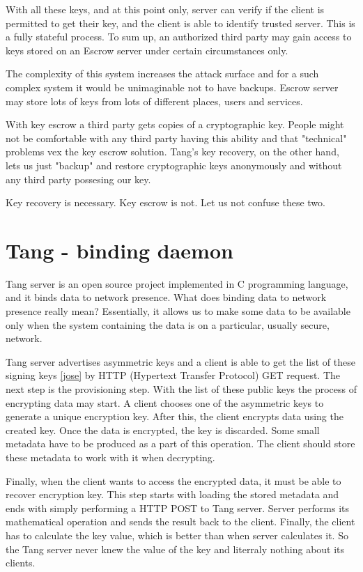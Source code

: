 With all these keys, and at this point only, server can verify if the client is permitted to get their key, and the client is able to identify trusted server.
This is a fully stateful process.
To sum up, an authorized third party may gain access to keys stored on an Escrow server under certain circumstances only.

The complexity of this system increases the attack surface and for a such complex system it would be unimaginable not to have backups.
Escrow server may store lots of keys from lots of different places, users and services.

With key escrow a third party gets copies of a cryptographic key.
People might not be comfortable with any third party having this ability and that "technical" problems vex the key escrow solution.
Tang's key recovery, on the other hand, lets us just "backup" and restore cryptographic keys anonymously and without any third party possesing our key.

Key recovery is necessary.
Key escrow is not.
Let us not confuse these two.

\section{Tang - binding daemon}

Tang server is an open source project implemented in C programming language, and it binds data to network presence.
What does binding data to network presence really mean? 
Essentially, it allows us to make some data to be available only when the system containing the data is on a particular, usually secure, network.

Tang server advertises asymmetric keys and a client is able to get the list of these signing keys \ref{jose} by HTTP (Hypertext Transfer Protocol) GET request.
The next step is the provisioning step. With the list of these public keys the process of encrypting data may start.
A client chooses one of the asymmetric keys to generate a unique encryption key.
After this, the client encrypts data using the created key. Once the data is encrypted, the key is discarded.
Some small metadata have to be produced as a part of this operation. The client should store these metadata to work with it when decrypting.

Finally, when the client wants to access the encrypted data, it must be able to recover encryption key.
This step starts with loading the stored metadata and ends with simply performing a HTTP POST to Tang server.
Server performs its mathematical operation and sends the result back to the client.
Finally, the client has to calculate the key value, which is better than when server calculates it.
So the Tang server never knew the value of the key and literraly nothing about its clients.

